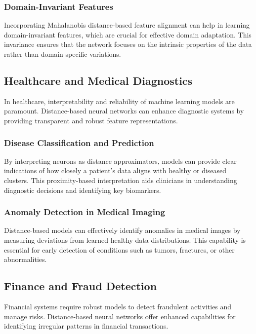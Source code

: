 \subsubsection{Domain-Invariant Features}
Incorporating Mahalanobis distance-based feature alignment can help in learning domain-invariant features, which are crucial for effective domain adaptation. This invariance ensures that the network focuses on the intrinsic properties of the data rather than domain-specific variations.

\subsection{Healthcare and Medical Diagnostics}
\label{subsec:healthcare}

In healthcare, interpretability and reliability of machine learning models are paramount. Distance-based neural networks can enhance diagnostic systems by providing transparent and robust feature representations.

\subsubsection{Disease Classification and Prediction}
By interpreting neurons as distance approximators, models can provide clear indications of how closely a patient's data aligns with healthy or diseased clusters. This proximity-based interpretation aids clinicians in understanding diagnostic decisions and identifying key biomarkers.

\subsubsection{Anomaly Detection in Medical Imaging}
Distance-based models can effectively identify anomalies in medical images by measuring deviations from learned healthy data distributions. This capability is essential for early detection of conditions such as tumors, fractures, or other abnormalities.

\subsection{Finance and Fraud Detection}
\label{subsec:finance}

Financial systems require robust models to detect fraudulent activities and manage risks. Distance-based neural networks offer enhanced capabilities for identifying irregular patterns in financial transactions.

